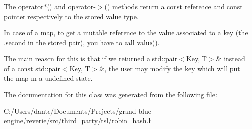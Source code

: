 The \textquotesingle{}\mbox{\hyperlink{group___geometry___module_gae9451098be60e8ceda3c583d96e0aee1}{operator$\ast$()}}\textquotesingle{} and \textquotesingle{}operator-\/$>$()\textquotesingle{} methods return a const reference and const pointer respectively to the stored value type.

In case of a map, to get a mutable reference to the value associated to a key (the \textquotesingle{}.second\textquotesingle{} in the stored pair), you have to call \textquotesingle{}value()\textquotesingle{}.

The main reason for this is that if we returned a {\ttfamily std\+::pair$<$Key, T$>$\&} instead of a {\ttfamily const std\+::pair$<$Key, T$>$\&}, the user may modify the key which will put the map in a undefined state. 

The documentation for this class was generated from the following file\+:\begin{DoxyCompactItemize}
\item 
C\+:/\+Users/dante/\+Documents/\+Projects/grand-\/blue-\/engine/reverie/src/third\+\_\+party/tsl/robin\+\_\+hash.\+h\end{DoxyCompactItemize}
